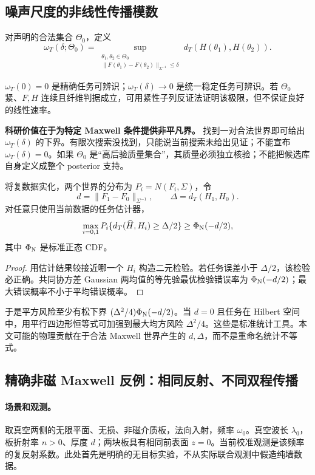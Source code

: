 \subsection{噪声尺度的非线性传播模数}
\begin{definition}[给定采集和材料类的任务歧义模数]
对声明的合法集合 $\Theta_0$，定义
\[
\omega_T(\delta;\Theta_0)=
\sup_{\substack{\theta_1,\theta_2\in\Theta_0\\
\|F(\theta_1)-F(\theta_2)\|_{\Sigma^{-1}}\le\delta}}
d_T(H(\theta_1),H(\theta_2)).
\]
\end{definition}
$\omega_T(0)=0$ 是精确任务可辨识；$\omega_T(\delta)\to0$ 是统一稳定任务可辨识。若 $\Theta_0$ 紧、$F,H$ 连续且纤维判据成立，可用紧性子列反证法证明该极限，但不保证良好的线性速率。

\textbf{科研价值在于为特定 Maxwell 条件提供非平凡界。} 找到一对合法世界即可给出 $\omega_T(\delta)$ 的下界。有限次搜索没找到，只能说当前搜索未给出见证；不能宣布 $\omega_T(\delta)=0$。如果 $\Theta_0$ 是“高后验质量集合”，其质量必须独立核验；不能把候选库自身定义成整个 posterior 支持。

\begin{proposition}[噪声下任务错误的二点下界]
将复数据实化，两个世界的分布为 $P_i=N(F_i,\Sigma)$，令
\[
d=\|F_1-F_0\|_{\Sigma^{-1}},\qquad
\Delta=d_T(H_1,H_0).
\]
对任意只使用当前数据的任务估计器，
\[
\max_{i=0,1}P_i\{d_T(\widehat H,H_i)\ge\Delta/2\}
\ge \Phi_{\rm N}(-d/2),
\]
其中 $\Phi_{\rm N}$ 是标准正态 CDF。
\end{proposition}
\begin{proof}
用估计结果较接近哪一个 $H_i$ 构造二元检验。若任务误差小于 $\Delta/2$，该检验必正确。共同协方差 Gaussian 两均值的等先验最优检验错误率为 $\Phi_{\rm N}(-d/2)$；最大错误概率不小于平均错误概率。
\end{proof}
于是平方风险至少有松下界 $(\Delta^2/4)\Phi_{\rm N}(-d/2)$。当 $d=0$ 且任务在 Hilbert 空间中，用平行四边形恒等式可加强到最大均方风险 $\Delta^2/4$。这些是标准统计工具。本文可能的物理贡献在于合法 Maxwell 世界产生的 $d,\Delta$，而不是重命名统计不等式。

\subsection{精确非磁 Maxwell 反例：相同反射、不同双程传播}
\paragraph{场景和观测。}
取真空两侧的无限平面、无损、非磁介质板，法向入射，频率 $\omega_0$。真空波长 $\lambda_0$，板折射率 $n>0$、厚度 $d$；两块板具有相同前表面 $z=0$。当前校准观测是该频率的复反射系数。此处首先是明确的无目标实验，不从实际联合观测中假造纯墙数据。

